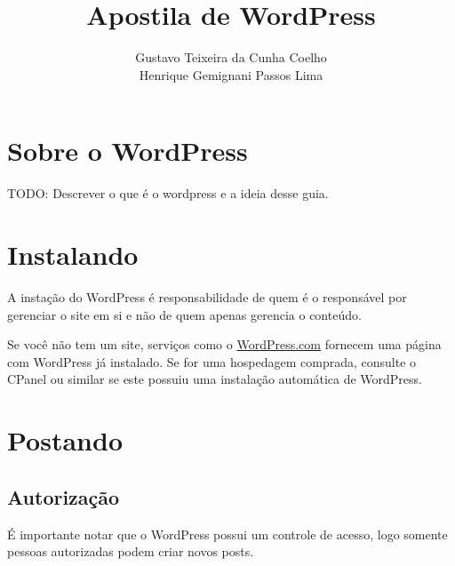 \documentclass[12pt,onecolumn]{article}
\begin{document}
\title{Apostila de WordPress}
\author{Gustavo Teixeira da Cunha Coelho \\ Henrique Gemignani Passos Lima}
\maketitle

\section{Sobre o WordPress}
	TODO: Descrever o que é o wordpress e a ideia desse guia.

\section{Instalando}
	A instação do WordPress é responsabilidade de quem é o responsável por gerenciar o site em si 
	e não de quem apenas gerencia o conteúdo.

	Se você não tem um site, serviços como o \href{https://wordpress.com/}{WordPress.com} fornecem
	uma página com WordPress já instalado. Se for uma hospedagem comprada, consulte o CPanel ou similar
	se este possuiu uma instalação automática de WordPress.

\section{Postando}

	\subsection{Autorização}
		É importante notar que o WordPress possui um controle de acesso, logo 
		somente pessoas autorizadas podem criar novos posts.
		
\end{document}
